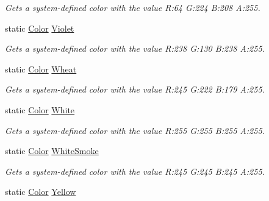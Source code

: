 \begin{DoxyCompactItemize}
\begin{DoxyCompactList}\small\item\em Gets a system-\/defined color with the value R\+:64 G\+:224 B\+:208 A\+:255.\end{DoxyCompactList}\item 
static \hyperlink{structMicrosoft_1_1Xna_1_1Framework_1_1Color}{Color} \hyperlink{structMicrosoft_1_1Xna_1_1Framework_1_1Color_abaf62a768000d22346bfca589db91189}{Violet}
\begin{DoxyCompactList}\small\item\em Gets a system-\/defined color with the value R\+:238 G\+:130 B\+:238 A\+:255.\end{DoxyCompactList}\item 
static \hyperlink{structMicrosoft_1_1Xna_1_1Framework_1_1Color}{Color} \hyperlink{structMicrosoft_1_1Xna_1_1Framework_1_1Color_a78d7d69e5ea955359ccda6a975481df3}{Wheat}
\begin{DoxyCompactList}\small\item\em Gets a system-\/defined color with the value R\+:245 G\+:222 B\+:179 A\+:255.\end{DoxyCompactList}\item 
static \hyperlink{structMicrosoft_1_1Xna_1_1Framework_1_1Color}{Color} \hyperlink{structMicrosoft_1_1Xna_1_1Framework_1_1Color_ac586768e5306fcce5ef5a07fcb012e0d}{White}
\begin{DoxyCompactList}\small\item\em Gets a system-\/defined color with the value R\+:255 G\+:255 B\+:255 A\+:255.\end{DoxyCompactList}\item 
static \hyperlink{structMicrosoft_1_1Xna_1_1Framework_1_1Color}{Color} \hyperlink{structMicrosoft_1_1Xna_1_1Framework_1_1Color_a00333695959a7d43d1f0869826182f30}{White\+Smoke}
\begin{DoxyCompactList}\small\item\em Gets a system-\/defined color with the value R\+:245 G\+:245 B\+:245 A\+:255.\end{DoxyCompactList}\item 
static \hyperlink{structMicrosoft_1_1Xna_1_1Framework_1_1Color}{Color} \hyperlink{structMicrosoft_1_1Xna_1_1Framework_1_1Color_a8317b63f8d153c779ba55709ade6f0b1}{Yellow}

\end{DoxyCompactItemize}
